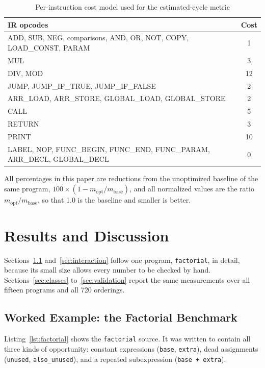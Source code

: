 \documentclass[conference]{IEEEtran}
\begin{document}
\begin{table}[!htbp]
\centering
\caption{Per-instruction cost model used for the estimated-cycle metric}
\label{tab:cost_model}
\renewcommand{\arraystretch}{1.15}
{\small
\begin{tabularx}{\columnwidth}{@{}>{\raggedright\arraybackslash}Xc@{}}
\toprule
\textbf{IR opcodes} & \textbf{Cost} \\
\midrule
ADD, SUB, NEG, comparisons, AND, OR, NOT, COPY, LOAD\_CONST, PARAM & 1 \\
MUL & 3 \\
DIV, MOD & 12 \\
JUMP, JUMP\_IF\_TRUE, JUMP\_IF\_FALSE & 2 \\
ARR\_LOAD, ARR\_STORE, GLOBAL\_LOAD, GLOBAL\_STORE & 2 \\
CALL & 5 \\
RETURN & 3 \\
PRINT & 10 \\
LABEL, NOP, FUNC\_BEGIN, FUNC\_END, FUNC\_PARAM, ARR\_DECL, GLOBAL\_DECL & 0 \\
\bottomrule
\end{tabularx}
}
\end{table}

All percentages in this paper are reductions from the unoptimized baseline of the same program, $100 \times (1 - m_{\mathrm{opt}}/m_{\mathrm{base}})$, and all normalized values are the ratio $m_{\mathrm{opt}}/m_{\mathrm{base}}$, so that 1.0 is the baseline and smaller is better.

\section{Results and Discussion}
Sections~\ref{sec:factorial} and~\ref{sec:interaction} follow one program, \texttt{factorial}, in detail, because its small size allows every number to be checked by hand. Sections~\ref{sec:classes} to~\ref{sec:validation} report the same measurements over all fifteen programs and all 720 orderings.

\subsection{Worked Example: the Factorial Benchmark}
\label{sec:factorial}
Listing~\ref{lst:factorial} shows the \texttt{factorial} source. It was written to contain all three kinds of opportunity: constant expressions (\texttt{base}, \texttt{extra}), dead assignments (\texttt{unused}, \texttt{also\_unused}), and a repeated subexpression (\texttt{base + extra}).
\end{document}
